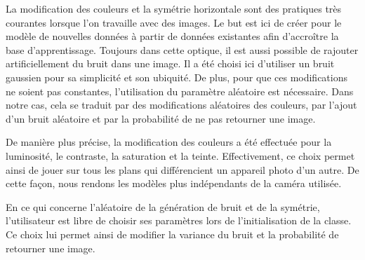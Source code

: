    La modification des couleurs et la symétrie horizontale sont des pratiques très courantes lorsque l'on travaille avec des images. Le but est ici de créer pour le modèle de nouvelles données à partir de données existantes afin d'accroître la base d'apprentissage. Toujours dans cette optique, il est aussi possible de rajouter artificiellement du bruit dans une image. Il a été choisi ici d'utiliser un bruit gaussien pour sa simplicité et son ubiquité. De plus, pour que ces modifications ne soient pas constantes, l'utilisation du paramètre aléatoire est nécessaire. Dans notre cas, cela se traduit par des modifications aléatoires des couleurs, par l'ajout d'un bruit aléatoire et par la probabilité de ne pas retourner une image.
    \bigskip
    
    De manière plus précise, la modification des couleurs a été effectuée pour la luminosité, le contraste, la saturation et la teinte. Effectivement, ce choix permet ainsi de jouer sur tous les plans qui différencient un appareil photo d'un autre. De cette façon, nous rendons les modèles plus indépendants de la caméra utilisée.
    \bigskip
    
    En ce qui concerne l'aléatoire de la génération de bruit et de la symétrie, l'utilisateur est libre de choisir ses paramètres lors de l'initialisation de la classe. Ce choix lui permet ainsi de modifier la variance du bruit et la probabilité de retourner une image.\\